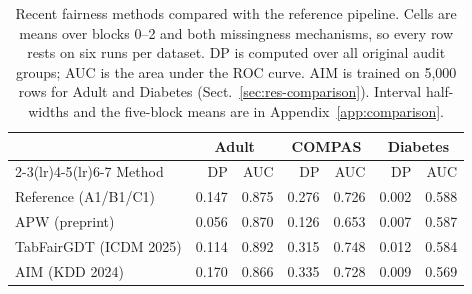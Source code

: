 \begin{table}[tb]
\centering\small
\caption{Recent fairness methods compared with the reference pipeline. Cells are means over blocks 0--2 and both missingness mechanisms, so every row rests on six runs per dataset. DP is computed over all original audit groups; AUC is the area under the ROC curve. AIM is trained on 5{,}000 rows for Adult and Diabetes (Sect.~\ref{sec:res-comparison}). Interval half-widths and the five-block means are in Appendix~\ref{app:comparison}.}\label{tab:comparison}
\begin{tabular}{@{}lrrrrrr@{}}
\toprule
& \multicolumn{2}{c}{Adult} & \multicolumn{2}{c}{COMPAS} & \multicolumn{2}{c}{Diabetes}\\
\cmidrule(lr){2-3}\cmidrule(lr){4-5}\cmidrule(lr){6-7}
Method & DP & AUC & DP & AUC & DP & AUC\\
\midrule
Reference (A1/B1/C1)       & 0.147 & 0.875 & 0.276 & 0.726 & 0.002 & 0.588 \\
APW (preprint)             & 0.056 & 0.870 & 0.126 & 0.653 & 0.007 & 0.587 \\
TabFairGDT (ICDM 2025)     & 0.114 & 0.892 & 0.315 & 0.748 & 0.012 & 0.584 \\
AIM (KDD 2024)             & 0.170 & 0.866 & 0.335 & 0.728 & 0.009 & 0.569 \\
\bottomrule\end{tabular}
\end{table}
